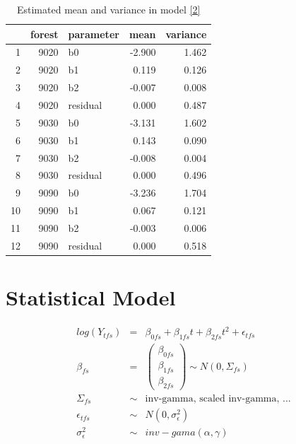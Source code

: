 \documentclass{article}\usepackage{graphicx, color}
\begin{document}
\begin{table}[ht]
\caption{Estimated mean and variance in model \ref{2}}
\begin{center}
\begin{tabular}{rrlrr}
  \hline
 & forest & parameter & mean & variance \\ 
  \hline
1 & 9020 & b0 & -2.900 & 1.462 \\ 
  2 & 9020 & b1 & 0.119 & 0.126 \\ 
  3 & 9020 & b2 & -0.007 & 0.008 \\ 
  4 & 9020 & residual & 0.000 & 0.487 \\ \hline
  5 & 9030 & b0 & -3.131 & 1.602 \\ 
  6 & 9030 & b1 & 0.143 & 0.090 \\ 
  7 & 9030 & b2 & -0.008 & 0.004 \\ 
  8 & 9030 & residual & 0.000 & 0.496 \\ \hline
  9 & 9090 & b0 & -3.236 & 1.704 \\ 
  10 & 9090 & b1 & 0.067 & 0.121 \\ 
  11 & 9090 & b2 & -0.003 & 0.006 \\ 
  12 & 9090 & residual & 0.000 & 0.518 \\ 
   \hline
\end{tabular}
\end{center}
\end{table}


\newpage

\section{Statistical Model} 

\begin{eqnarray}
\nonumber log(Y_{tfs}) &=&  \beta_{0fs} + \beta_{1fs}t + \beta_{2fs}t^2 + \epsilon_{tfs}  \\
\nonumber \beta_{fs} &=& \left(\begin{array}{c}
    \beta_{0fs}   \\ 
    \beta_{1fs}  \\ 
    \beta_{2fs}  
\end{array}\right) \sim N(0, \Sigma_{fs}) \\
\nonumber \Sigma_{fs}  &\sim& \mbox{inv-gamma, scaled inv-gamma, ...} \\ 
\nonumber \epsilon_{tfs}  &\sim& N(0,\sigma_{\epsilon}^2) \\
\nonumber \sigma_{\epsilon}^2  &\sim& inv-gama(\alpha,\gamma) \\
\label{mod3}
\end{eqnarray}






\end{document}

